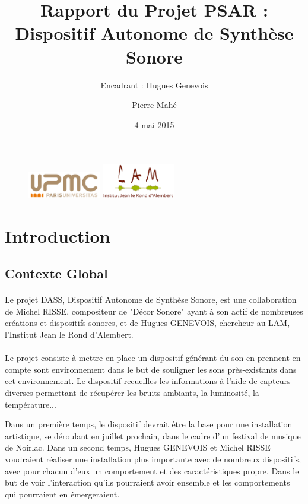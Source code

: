 \documentclass[a4paper, titlepage, oneside, 12pt]{article}%
\title{Rapport du Projet PSAR :\\ Dispositif Autonome de Synthèse Sonore}
\subtitle{Encadrant : Hugues Genevois}
\author{Pierre Mahé}
\date{4 mai 2015}
\begin{document}
  
 \begin{figure}[b]
	\includegraphics[width=120px] {upmc_logo.jpg}
	\hspace{7cm}
	\vspace{-2cm}
	\includegraphics[width=120px] {LogoLAM.jpg}
\end{figure}

\maketitle 
\tableofcontents

\newpage
\section{Introduction}
\subsection{Contexte Global}

\paragraph{}
Le projet DASS, Dispositif Autonome de Synthèse Sonore, est une collaboration de Michel RISSE, compositeur de "Décor Sonore" ayant à son actif de nombreuses créations et dispositifs sonores, et de Hugues GENEVOIS, chercheur au LAM, l'Institut Jean le Rond d'Alembert.

\paragraph{}
Le projet consiste à mettre en place un dispositif générant du son en prennent en compte sont environnement dans le but de souligner les sons près-existants dans cet environnement. Le dispositif recueilles les informations à l'aide de capteurs diverses permettant de récupérer les bruits ambiants, la luminosité, la température...

Dans un première temps, le dispositif devrait être la base pour une installation artistique, se déroulant en juillet prochain, dans le cadre d'un festival de musique de Noirlac. Dans un second temps, Hugues GENEVOIS et Michel RISSE voudraient réaliser une installation plus importante avec de nombreux dispositifs, avec pour chacun d'eux un comportement et des caractéristiques propre. Dans le but de voir l’interaction qu'ils pourraient avoir ensemble et les comportements qui pourraient en émergeraient.
\end{document}
